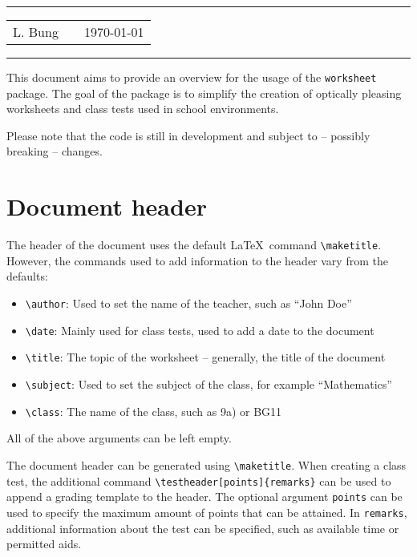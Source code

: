 \documentclass[11pt, a4paper, oneside]{article}
\begin{document}
	\begin{table}
	\hrule
	\vspace{.1cm}
	\setlength{\tabcolsep}{0cm}
	\renewcommand{\arraystretch}{1.5}
	\begin{tabular}{p{4cm} >{\Large\bfseries}p{8cm} p{4cm}}
		\multirow{2}{4cm}{L. Bung} & \multirow{2}{8cm}{\centering The worksheet package} & \multirow{2}{4cm}{\today} \\\\
	\end{tabular}
	\hrule
	\end{table}
	
	This document aims to provide an overview for the usage of the \texttt{worksheet} package.
	The goal of the package is to simplify the creation of optically pleasing worksheets and class tests used in school environments.
	
	Please note that the code is still in development and subject to -- possibly breaking -- changes.
	
	\section*{Document header}
	
	The header of the document uses the default \LaTeX\ command \texttt{\textbackslash maketitle}.
	However, the commands used to add information to the header vary from the defaults:
	\begin{itemize}[label=]
		\item \texttt{\textbackslash author}: Used to set the name of the teacher, such as ``John Doe''
		\item \texttt{\textbackslash date}: Mainly used for class tests, used to add a date to the document
		\item \texttt{\textbackslash title}: The topic of the worksheet -- generally, the title of the document
		\item \texttt{\textbackslash subject}: Used to set the subject of the class, for example ``Mathematics''
		\item \texttt{\textbackslash class}: The name of the class, such as 9a) or BG11
	\end{itemize}
	All of the above arguments can be left empty.
	
	The document header can be generated using \texttt{\textbackslash maketitle}.
	When creating a class test, the additional command \texttt{\textbackslash testheader[points]\{remarks\}} can be used to append a grading template to the header.
	The optional argument \texttt{points} can be used to specify the maximum amount of points that can be attained.
	In \texttt{remarks}, additional information about the test can be specified, such as available time or permitted aids.
	
\end{document}

